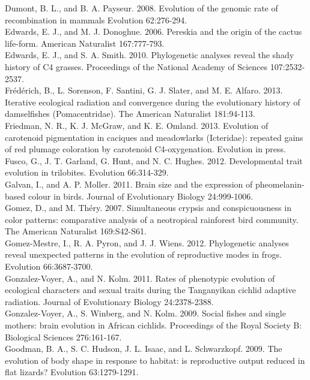 \documentclass[a4paper,12pt]{article}
\begin{document}
Dumont, B. L., and B. A. Payseur. 2008. Evolution of the genomic rate of recombination in mammals Evolution 62:276-294.\\
Edwards, E. J., and M. J. Donoghue. 2006. Pereskia and the origin of the cactus life-form. American Naturalist 167:777-793.\\
Edwards, E. J., and S. A. Smith. 2010. Phylogenetic analyses reveal the shady history of C4 grasses. Proceedings of the National Academy of Sciences 107:2532-2537.\\
Fr\'{e}d\'{e}rich, B., L. Sorenson, F. Santini, G. J. Slater, and M. E. Alfaro. 2013. Iterative ecological radiation and convergence during the evolutionary history of damselfishes (Pomacentridae). The American Naturalist 181:94-113.\\
Friedman, N. R., K. J. McGraw, and K. E. Omland. 2013. Evolution of carotenoid pigmentation in caciques and meadowlarks (Icteridae): repeated gains of red plumage coloration by carotenoid C4-oxygenation. Evolution in press.\\
Fusco, G., J. T. Garland, G. Hunt, and N. C. Hughes. 2012. Developmental trait evolution in trilobites. Evolution 66:314-329.\\
Galvan, I., and A. P. Moller. 2011. Brain size and the expression of pheomelanin-based colour in birds. Journal of Evolutionary Biology 24:999-1006.\\
Gomez, D., and M. Th\'{e}ry. 2007. Simultaneous crypsis and conspicuousness in color patterns: comparative analysis of a neotropical rainforest bird community. The American Naturalist 169:S42-S61.\\
Gomez-Mestre, I., R. A. Pyron, and J. J. Wiens. 2012. Phylogenetic analyses reveal unexpected patterns in the evolution of reproductive modes in frogs. Evolution 66:3687-3700.\\
Gonzalez-Voyer, A., and N. Kolm. 2011. Rates of phenotypic evolution of ecological characters and sexual traits during the Tanganyikan cichlid adaptive radiation. Journal of Evolutionary Biology 24:2378-2388.\\
Gonzalez-Voyer, A., S. Winberg, and N. Kolm. 2009. Social fishes and single mothers: brain evolution in African cichlids. Proceedings of the Royal Society B: Biological Sciences 276:161-167.\\
Goodman, B. A., S. C. Hudson, J. L. Isaac, and L. Schwarzkopf. 2009. The evolution of body shape in response to habitat: is reproductive output reduced in flat lizards? Evolution 63:1279-1291.\\
\end{document}
